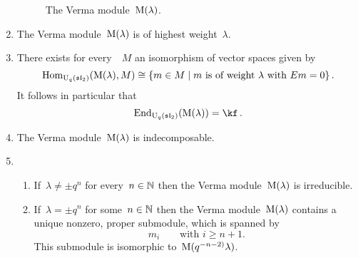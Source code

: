 \documentclass[a4paper, 11pt, oneside]{scrartcl}
\begin{document}
\begin{proposition}
\begin{enumerate}
\begin{figure}
\begin{center}
        \end{center}
        \caption{The Verma module~$\operatorname{M}(\lambda)$.}
        \label{graphical representation of quantum verma module}
      \end{figure}
    \item
      The Verma module~$\operatorname{M}(\lambda)$ is of highest weight~$\lambda$.
    \item
      There exists for every~~$M$ an isomorphism of vector spaces given by
      \[
        \Hom_{\Univ_q(\sllie_2)}( \verma(\lambda), M )
        \cong
        \{
          m \in M
        \suchthat
          \text{$m$ is of weight~$\lambda$ with~$Em = 0$}
        \} \,.
      \]
      It follows in particular that
      \[
        \End_{\Univ_q(\sllie_2)}( \verma(\lambda) )
        =
        \kf \,.
      \]
    \item
      The Verma module~$\operatorname{M}(\lambda)$ is indecomposable.
    \item
      \begin{enumerate}
        \item
          If~$\lambda \neq \pm q^n$ for every~$n \in \mathbb{N}$ then the Verma module~$\operatorname{M}(\lambda)$ is irreducible.
        \item
          If~$\lambda = \pm q^n$ for some~$n \in \mathbb{N}$ then the Verma module~$\operatorname{M}(\lambda)$ contains a unique nonzero, proper submodule, which is spanned by
          \[
            m_i
            \qquad
            \text{with~$i \geq n+1$.}
          \]
          This submodule is isomorphic to~$\operatorname{M}(q^{-n-2)} \lambda)$.
      \end{enumerate}
  \end{enumerate}
\end{proposition}
\end{document}
